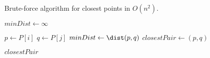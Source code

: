  \begin{algorithm}[ht]
 \scriptsize
 \caption{Brute-force algorithm for closest points in $O(n^2)$.}
 \label{alg:closestBF}
$minDist  \gets \infty $ \;
 {
 {

  $p \gets P[i]$ \;
  $q \gets P[j]$ \;
   {
    $minDist \gets \dist(p,q)$\;
    $closestPair \gets (p,q)$\;
  }
}
}
\Return $closestPair$
 \end{algorithm} 